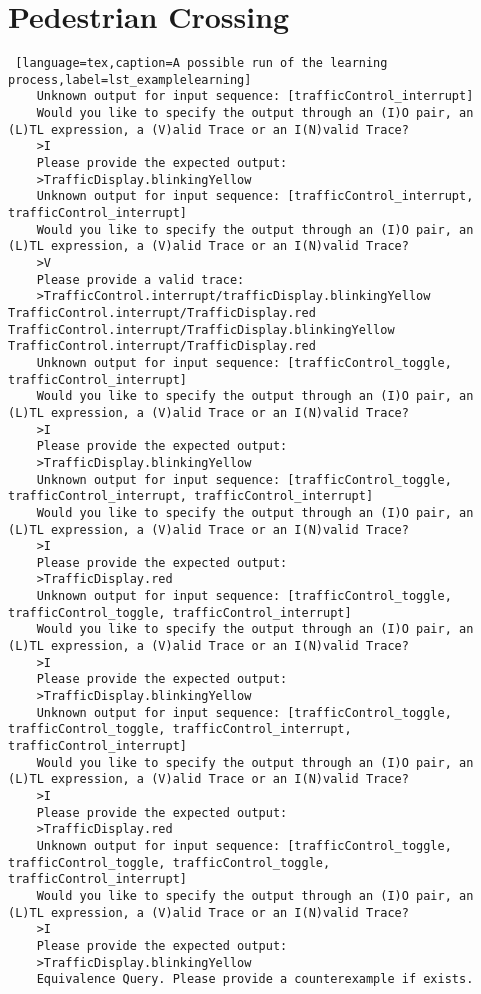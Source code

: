 \clearpage\section{Pedestrian Crossing}
\bigskip
\begin{lstlisting} [language=tex,caption=A possible run of the learning process,label=lst_examplelearning]
	Unknown output for input sequence: [trafficControl_interrupt]
	Would you like to specify the output through an (I)O pair, an (L)TL expression, a (V)alid Trace or an I(N)valid Trace?
	>I
	Please provide the expected output:
	>TrafficDisplay.blinkingYellow
	Unknown output for input sequence: [trafficControl_interrupt, trafficControl_interrupt]
	Would you like to specify the output through an (I)O pair, an (L)TL expression, a (V)alid Trace or an I(N)valid Trace?
	>V
	Please provide a valid trace:
	>TrafficControl.interrupt/trafficDisplay.blinkingYellow TrafficControl.interrupt/TrafficDisplay.red TrafficControl.interrupt/TrafficDisplay.blinkingYellow TrafficControl.interrupt/TrafficDisplay.red
	Unknown output for input sequence: [trafficControl_toggle, trafficControl_interrupt]
	Would you like to specify the output through an (I)O pair, an (L)TL expression, a (V)alid Trace or an I(N)valid Trace?
	>I
	Please provide the expected output:
	>TrafficDisplay.blinkingYellow
	Unknown output for input sequence: [trafficControl_toggle, trafficControl_interrupt, trafficControl_interrupt]
	Would you like to specify the output through an (I)O pair, an (L)TL expression, a (V)alid Trace or an I(N)valid Trace?
	>I
	Please provide the expected output:
	>TrafficDisplay.red
	Unknown output for input sequence: [trafficControl_toggle, trafficControl_toggle, trafficControl_interrupt]
	Would you like to specify the output through an (I)O pair, an (L)TL expression, a (V)alid Trace or an I(N)valid Trace?
	>I
	Please provide the expected output:
	>TrafficDisplay.blinkingYellow
	Unknown output for input sequence: [trafficControl_toggle, trafficControl_toggle, trafficControl_interrupt, trafficControl_interrupt]
	Would you like to specify the output through an (I)O pair, an (L)TL expression, a (V)alid Trace or an I(N)valid Trace?
	>I
	Please provide the expected output:
	>TrafficDisplay.red
	Unknown output for input sequence: [trafficControl_toggle, trafficControl_toggle, trafficControl_toggle, trafficControl_interrupt]
	Would you like to specify the output through an (I)O pair, an (L)TL expression, a (V)alid Trace or an I(N)valid Trace?
	>I
	Please provide the expected output:
	>TrafficDisplay.blinkingYellow
	Equivalence Query. Please provide a counterexample if exists.
\end{lstlisting}
